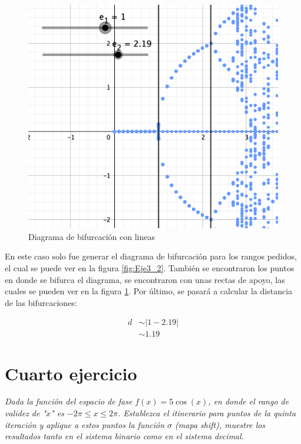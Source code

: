 \documentclass[11pt]{report}
\theoremstyle{plain}
\theoremstyle{definition}
\begin{document}
\begin{figure}[!h] %
	\centering
	\includegraphics[scale=0.3]{caos_3_3.png}
	\caption{Diagrama de bifurcación con lineas}
	\label{fig:Eje3_3}
\end{figure}

En este caso solo fue generar el diagrama de bifurcación para los rangos pedidos, el cual se puede ver en la figura \ref{fig:Eje3_2}.
También se encontraron los puntos en donde se bifurca el diagrama, se encontraron con unas rectas de apoyo, las cuales se pueden ver en la figura \ref{fig:Eje3_3}.
Por último, se pasará a calcular la distancia de las bifurcaciones:

\begin{align*}
	d &\sim |1-2.19|\\
	&\sim 1.19
\end{align*}

\section{Cuarto ejercicio}
\textit{Dada la función del espacio de fase $f(x) = 5\cos(x)$, en donde el rango de validez de "$x$" es $-2\pi\leq x \leq 2\pi$. Establezca el itinerario para puntos de la quinta iteración y aplique a estos puntos la función $\sigma$ (mapa shift), muestre los resultados tanto en el sistema binario como en el sistema decimal.}


\end{document}
